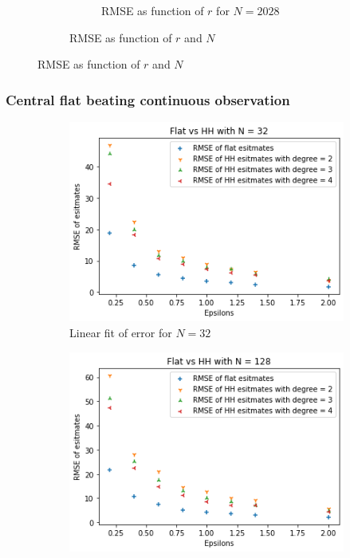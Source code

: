 \documentclass[11pt]{article}
\theoremstyle{definition}
\begin{document}
\begin{figure}[H]
\begin{subfigure}{.4\textwidth}
\begin{subfigure}{\textwidth}
  \caption{RMSE as function of $r$ for $N=2028$}
  \label{fig:a}
\end{subfigure}
\caption{RMSE as function of $r$ and $N$}
\label{fig:b}
\end{subfigure}
\caption{RMSE as function of $r$ and $N$}
\label{fig:a}
\end{figure}

\subsubsection{Central flat beating continuous observation}\label{app:cen_flat_over}
\begin{figure}[H]
\centering
\begin{subfigure}{.4\textwidth}
  \centering
  \includegraphics[width=\linewidth]{figures/central_flat_hh/flat_beat_hh_N=32.png}
  \caption{Linear fit of error for $N=32$}
  \label{fig:10}
\end{subfigure}%
\begin{subfigure}{.4\textwidth}
  \centering
  \includegraphics[width=\linewidth]{figures/central_flat_hh/flat_beat_hh_N=128.png}

\end{subfigure}
\end{figure}
\end{document}
